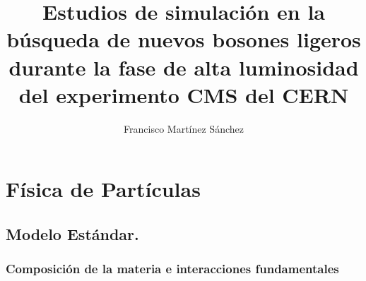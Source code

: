 \documentclass[12pt]{report}
\begin{document}
\title{Estudios de simulación en la búsqueda de nuevos bosones ligeros durante la fase de alta luminosidad del experimento CMS del CERN}
\author{Francisco Martínez Sánchez}
\maketitle


\tableofcontents
\clearpage
\listoftables
\clearpage
\listoffigures
\clearpage

\begin{abstract}
\end{abstract}









\chapter{Física de Partículas}


	
	\section{Modelo Estándar.} 	
	
	
		\subsection{Composición de la materia e interacciones fundamentales} 
		
		
\end{document}
